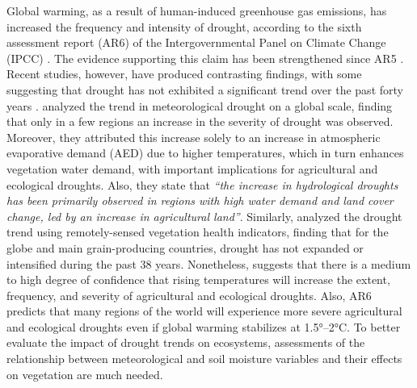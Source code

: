 \documentclass[
  authoryear,
  preprint,
  3p,
  onecolumn]{elsarticle}
\begin{document}
Global warming, as a result of human-induced greenhouse gas emissions,
has increased the frequency and intensity of drought, according to the
sixth assessment report (AR6) of the Intergovernmental Panel on Climate
Change (IPCC) \citep{IPCC2023}. The evidence supporting this claim has
been strengthened since AR5 \citep{IPCC2013}. Recent studies, however,
have produced contrasting findings, with some suggesting that drought
has not exhibited a significant trend over the past forty years
\citep{Vicente-Serrano2022, Kogan2020}. \citet{Vicente-Serrano2022}
analyzed the trend in meteorological drought on a global scale, finding
that only in a few regions an increase in the severity of drought was
observed. Moreover, they attributed this increase solely to an increase
in atmospheric evaporative demand (AED) due to higher temperatures,
which in turn enhances vegetation water demand, with important
implications for agricultural and ecological droughts. Also, they state
that \emph{``the increase in hydrological droughts has been primarily
observed in regions with high water demand and land cover change, led by
an increase in agricultural land''}. Similarly, \citet{Kogan2020}
analyzed the drought trend using remotely-sensed vegetation health
indicators, finding that for the globe and main grain-producing
countries, drought has not expanded or intensified during the past 38
years. Nonetheless, \citet{IPCC2021} suggests that there is a medium to
high degree of confidence that rising temperatures will increase the
extent, frequency, and severity of agricultural and ecological droughts.
Also, AR6 \citep{IPCC2023} predicts that many regions of the world will
experience more severe agricultural and ecological droughts even if
global warming stabilizes at 1.5°--2°C. To better evaluate the impact of
drought trends on ecosystems, assessments of the relationship between
meteorological and soil moisture variables and their effects on
vegetation are much needed.
\end{document}

